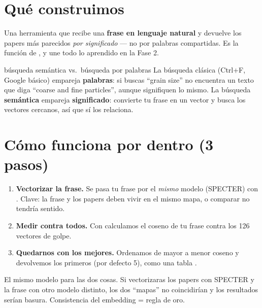 \documentclass[11pt,a4paper]{article}
\begin{document}

\section{Qué construimos}

Una herramienta que recibe una \textbf{frase en lenguaje natural} y devuelve los papers más
parecidos \emph{por significado} --- no por palabras compartidas. Es la función
 de , y une todo lo aprendido en la Fase 2.

\begin{concepto}{búsqueda semántica vs.\ búsqueda por palabras}
La búsqueda clásica (Ctrl+F, Google básico) empareja \textbf{palabras}: si buscas ``grain
size'' no encuentra un texto que diga ``coarse and fine particles'', aunque signifiquen lo
mismo. La búsqueda \textbf{semántica} empareja \textbf{significado}: convierte tu frase en un
vector y busca los vectores cercanos, así que sí los relaciona.
\end{concepto}

\section{Cómo funciona por dentro (3 pasos)}

\begin{enumerate}
  \item \textbf{Vectorizar la frase.} Se pasa tu frase por el \emph{mismo} modelo (SPECTER)
        con . Clave: la frase y los papers deben vivir en el
        mismo mapa, o comparar no tendría sentido.
  \item \textbf{Medir contra todos.} Con  calculamos el coseno de
        tu frase contra los 126 vectores de golpe.
  \item \textbf{Quedarnos con los mejores.} Ordenamos de mayor a menor coseno y devolvemos los
         primeros (por defecto 5), como una tabla .
\end{enumerate}

\begin{ojo}
El mismo modelo para las dos cosas. Si vectorizaras los papers con SPECTER y la frase con
otro modelo distinto, los dos ``mapas'' no coincidirían y los resultados serían basura.
Consistencia del embedding = regla de oro.
\end{ojo}
\end{document}
